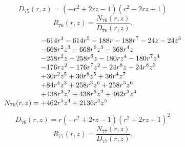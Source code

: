 \documentclass[11pt,a4paper]{article}
\begin{document}
\begin{equation}
D_{75}(r,z)=\left(- r^{2} + 2 r z - 1\right) \left(r^{2} + 2 r z + 1\right)
\label{eq:cat-denominator-75}
\end{equation}
\begin{equation}
R_{76}(r,z)=\frac{N_{76}(r,z)}{D_{76}(r,z)}.
\label{eq:cat-rational-76}
\end{equation}
\begin{equation}
N_{76}(r,z)=\shortstack[l]{$\displaystyle  - 614 r^{3} - 614 r^{5} - 188 r - 188 r^{7} - 24 z - 24 z^{3}$\\
$\displaystyle  - 668 r^{2} z^{3} - 668 r^{6} z^{3} - 368 r^{4} z$\\
$\displaystyle  - 258 r^{2} z - 258 r^{6} z - 180 r z^{4} - 180 r^{7} z^{4}$\\
$\displaystyle  - 176 r z^{2} - 176 r^{7} z^{2} - 24 r^{8} z - 24 r^{8} z^{3}$\\
$\displaystyle  + 30 r^{2} z^{5} + 30 r^{6} z^{5} + 36 r^{4} z^{7}$\\
$\displaystyle  + 84 r^{4} z^{3} + 258 r^{3} z^{6} + 258 r^{5} z^{6}$\\
$\displaystyle  + 438 r^{3} z^{2} + 438 r^{5} z^{2} + 462 r^{3} z^{4}$\\
$\displaystyle  + 462 r^{5} z^{4} + 2136 r^{4} z^{5}$}
\label{eq:cat-numerator-76}
\end{equation}
\begin{equation}
D_{76}(r,z)=r \left(- r^{2} + 2 r z - 1\right) \left(r^{2} + 2 r z + 1\right)^{2}
\label{eq:cat-denominator-76}
\end{equation}
\begin{equation}
R_{77}(r,z)=\frac{N_{77}(r,z)}{D_{77}(r,z)}.
\label{eq:cat-rational-77}
\end{equation}
\end{document}
